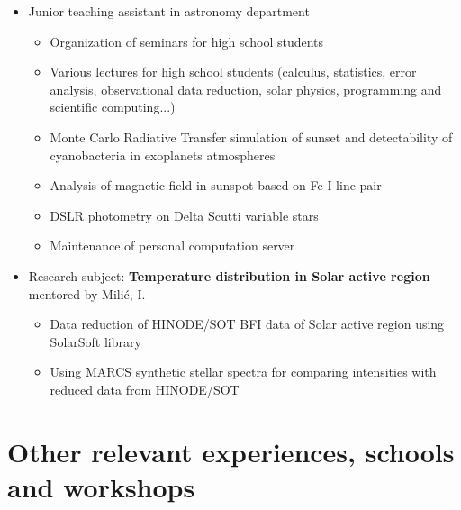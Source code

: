 \documentclass[12p,a4paper,sans]{moderncv}        %
\begin{document}
	{
	\begin{itemize}
		\item{Junior teaching assistant in astronomy department}		
		\begin{itemize}
			\item {Organization of seminars for high school students}
			\item {Various lectures for high school students (calculus, statistics, error analysis, observational data reduction, solar physics, programming and scientific computing...)}
			\item{Monte Carlo Radiative Transfer simulation of sunset and detectability of cyanobacteria in exoplanets atmospheres}
			\item{Analysis of magnetic field in sunspot based on Fe I line pair}
			\item{DSLR photometry on Delta Scutti variable stars}
			\item{Maintenance of personal computation server}
		\end{itemize}				
	\end{itemize}			
	}


	{
    	\begin{itemize}
            \item{Research subject: \textbf{Temperature distribution in Solar active region} mentored by Milić, I.}
            \begin{itemize}
				\item{Data reduction of HINODE/SOT BFI data of Solar active region using SolarSoft library}
                \item{Using MARCS synthetic stellar spectra for comparing intensities with reduced data from HINODE/SOT}
			\end{itemize}
		\end{itemize}
    }


\section{Other relevant experiences, schools and workshops}
	
\end{document}
